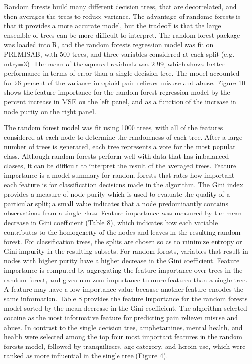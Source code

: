 \documentclass[sigconf]{acmart}
\begin{document}
Random forests build many different decision trees, that are decorrelated, and 
then averages the trees to reduce variance. The advantage of randome forests is 
that it provides a more accurate model, but the tradeoff is that the large 
ensemble of trees can be more difficult to interpret. The random forest package 
was loaded into R, and the random forests regression model was fit on PRLMISAB, 
with 500 trees, and three variables considered at each split (e.g., mtry=3).
The mean of the squared residuals was 2.99, which shows better performance
in terms of error than a single decision tree. The model accounted for 26
percent of the variance in opioid pain reliever misuse and abuse. Figure 10
shows the feature importance for the random forest regression model by the
percent increase in MSE on the left panel, and as a function of the increase
in node purity on the right panel. 


The random forest model was fit using 1000 trees, with all of the features 
considered at each node to determine the randomness of each tree. After a 
large number of trees is generated, each tree represents a vote for the
most popular class. Although random forests perform well with data that has
imbalanced classes, it can be difficult to interpret the result of the 
averaged trees. Feature importance is a model summary for random forests 
that rates how important each feature is for classification decisions made 
in the algorithm. The Gini index provides a measure of node purity which is 
used to evaluate the quality of a particular split; a small value indicates 
that a node predominantly contains observations from a single class. 
Feature importance was measured by the mean decrease in Gini coefficient 
(Table 8), which indicates how each variable contributes to the homogeneity 
of the nodes and leaves in the resulting random forest. For classification 
trees, the splits are chosen so as to minimize entropy or Gini impurity in 
the resulting subsets. For random forests, variables that result in nodes 
with higher purity have a higher decrease in the Gini coefficient. Feature 
importance is computed by aggregating the feature importance over trees in 
the random forest, and gives non-zero importance to more features than a 
single tree. A feature may have a low importance value because another feature 
encodes the same information. Table 8 provides the feature importance for 
the random forests model sorted by the mean decrease in the Gini coefficient. 
The algorithm selected cocaine as the most informative feature for predicting 
pain reliever misuse and abuse. In contrast to the single decision tree, 
amphetamines, mental health, and health were selected among the top four most 
important features in the random forests model, followed by tranquilizers, 
age category, and heroin use, which were ranked as more influential in the 
single tree (Figure 4). 
\end{document}
